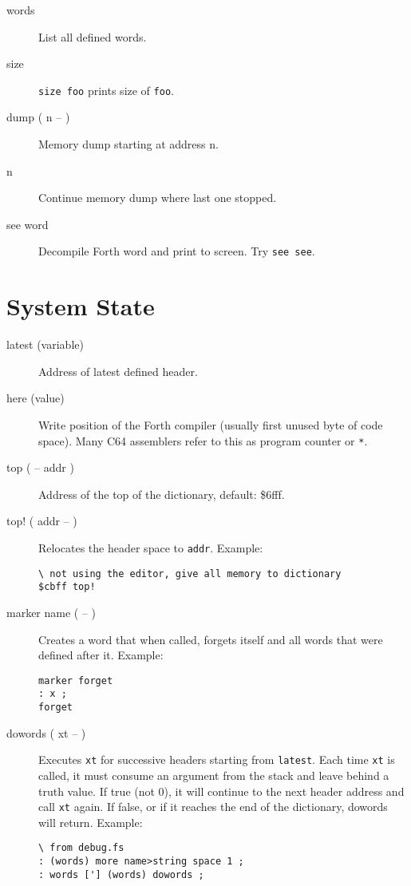 \begin{description}
\item[words] List all defined words.
\item[size] \texttt{size foo} prints size of \texttt{foo}.
\item[dump ( n -- )] Memory dump starting at address n.
\item[n] Continue memory dump where last one stopped.
\item[see word] Decompile Forth word and print to screen. Try \texttt{see see}.
\end{description}

\section{System State}

\begin{description}


\item[latest (variable)] Address of latest defined header.

\item[here (value)] Write position of the Forth compiler (usually first unused byte of code space). Many C64 assemblers refer to this as program counter or \texttt{*}.


\item[top ( -- addr )] Address of the top of the dictionary, default: \$6fff. 

\item[top! ( addr -- )] Relocates the header space to \texttt{addr}. Example:

\begin{verbatim}
\ not using the editor, give all memory to dictionary
$cbff top!
\end{verbatim}

\item[marker name ( -- )] Creates a word that when called, forgets itself and all words that were defined after it. Example:

\begin{verbatim}
marker forget
: x ;
forget
\end{verbatim}

\item[dowords ( xt -- )] Executes \texttt{xt} for successive headers starting from \texttt{latest}. Each time \texttt{xt} is called, it must consume an argument from the stack and leave behind a truth value. If true (not 0), it will continue to the next header address and call \texttt{xt} again. If false, or if it reaches the end of the dictionary, dowords will return. Example:

\begin{verbatim}
\ from debug.fs
: (words) more name>string space 1 ;
: words ['] (words) dowords ;
\end{verbatim}
\end{description}

